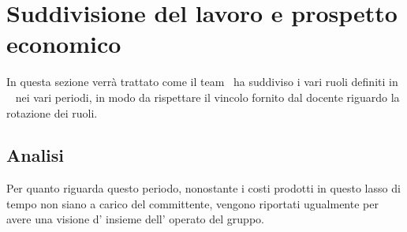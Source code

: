 \section{Suddivisione del lavoro e prospetto economico}
In questa sezione verrà trattato come il team \gruppo ~ha suddiviso i vari ruoli definiti in \NormeDiProgetto~ nei vari periodi, in modo da rispettare il vincolo fornito dal docente riguardo la rotazione dei ruoli.
\subsection{Analisi}
Per quanto riguarda questo periodo, nonostante i costi prodotti in questo lasso di tempo non siano a carico del committente, vengono riportati ugualmente per avere una visione d' insieme dell' operato del gruppo.\\
